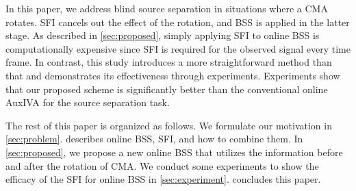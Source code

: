 \documentclass[sip,biber]{now-journal}
\begin{document}
In this paper, we address blind source separation in situations where a CMA rotates.
SFI cancels out the effect of the rotation, and BSS is applied in the latter stage.
As described in \cref{sec:proposed}, simply applying SFI to online BSS is computationally expensive since SFI is required for the observed signal every time frame.
In contrast, this study introduces a more straightforward method than that and demonstrates its effectiveness through experiments.
Experiments show that our proposed scheme is significantly better than the conventional online AuxIVA for the source separation task.

The rest of this paper is organized as follows.
We formulate our motivation in \cref{sec:problem}.
 describes online BSS, SFI, and how to combine them.
In \cref{sec:proposed}, we propose a new online BSS that utilizes the information before and after the rotation of CMA.
We conduct some experiments to show the efficacy of the SFI for online BSS in \cref{sec:experiment}.
 concludes this paper.
\end{document}
